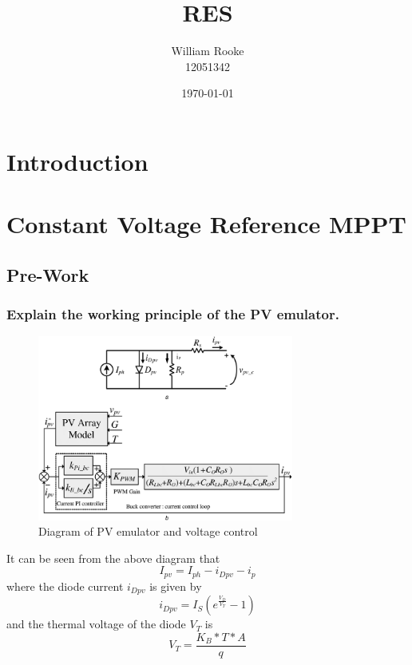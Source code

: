 \documentclass[]{article}
\title{RES}
\author{William Rooke\\12051342}
\date{\today}
\begin{document}
	
	\section{Introduction}
	    

   	
   	\section{Constant Voltage Reference MPPT}
   	    \subsection{Pre-Work}
       	    \subsubsection{Explain the working principle of the PV emulator.}
    	        \begin{figure}[H]
    	        	\centering
    	        	\includegraphics*[width=0.75\textwidth]{Prework_images/PVDiagram}
    	        	\caption{Diagram of PV emulator and voltage control}
    	        \end{figure}
    	        It can be seen from the above diagram that
    	        \begin{equation}\label{eq:TotalCurrent}
    	            I_{pv} = I_{ph} - i_{Dpv} - i_p
    	        \end{equation}
    	        where the diode current $i_{Dpv}$ is given by
    	        \begin{equation}\label{eq:DiodeCurrent}
    	            i_{Dpv} = I_S (e^{\frac{V_D}{V_T}} - 1)
    	        \end{equation}
    	        and the thermal voltage of the diode $V_T$ is 
    	        \begin{equation}\label{eq:ThermalVoltage}
    	            V_T=\frac{K_B*T*A}{q}
    	        \end{equation}
\end{document}
